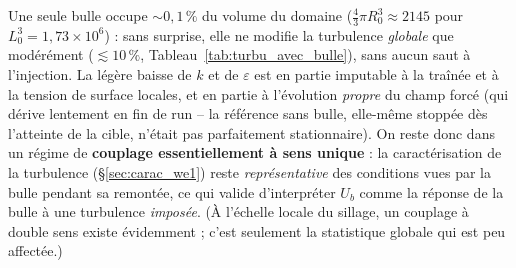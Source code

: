 Une seule bulle occupe $\sim 0{,}1\,\%$ du volume du domaine ($\frac{4}{3}\pi R_0^3
\approx 2145$ pour $L_0^3 = 1{,}73\times 10^6$) : sans surprise, elle ne modifie la
turbulence \emph{globale} que modérément ($\lesssim 10\,\%$,
Tableau~\ref{tab:turbu_avec_bulle}), sans aucun saut à l'injection. La légère baisse
de $k$ et de $\varepsilon$ est en partie imputable à la traînée et à la tension de
surface locales, et en partie à l'évolution \emph{propre} du champ forcé (qui dérive
lentement en fin de run -- la référence sans bulle, elle-même stoppée dès l'atteinte
de la cible, n'était pas parfaitement stationnaire). On reste donc dans un régime de
\textbf{couplage essentiellement à sens unique} : la caractérisation de la turbulence
(\S\ref{sec:carac_we1}) reste \emph{représentative} des conditions vues par la bulle
pendant sa remontée, ce qui valide d'interpréter $U_b$ comme la réponse de la bulle
à une turbulence \emph{imposée}. (À l'échelle locale du sillage, un couplage à
double sens existe évidemment ; c'est seulement la statistique globale qui est peu
affectée.)
